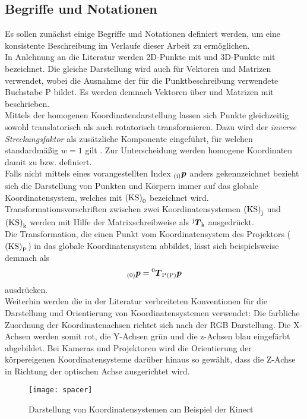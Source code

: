 \subsection{Begriffe und Notationen}
Es sollen zunächst einige Begriffe und Notationen definiert werden, um eine konsistente Beschreibung im Verlaufe dieser Arbeit zu ermöglichen.\\
In Anlehnung an die Literatur \cite{Zhang2000} werden 2D-Punkte mit  und 3D-Punkte mit  bezeichnet. Die gleiche Darstellung wird auch für Vektoren und Matrizen verwendet, wobei die Ausnahme der für die Punktbeschreibung verwendete Buchstabe P bildet. Es werden demnach Vektoren über  und Matrizen mit  beschrieben.\\
Mittels der homogenen Koordinatendarstellung lassen sich Punkte gleichzeitig sowohl translatorisch als auch rotatorisch transformieren. Dazu wird der \textit{inverse Streckungsfaktor} als zusätzliche Komponente eingeführt, für welchen standardmäßig $w=1$ gilt \cite{Nischwitz20111}. Zur Unterscheidung werden homogene Koordinaten damit zu  bzw.  definiert.\\
Falls nicht mittels eines vorangestellten Index ${_{{\mathrm{(i)}}}}\mbox{\boldmath{$p$}}$ anders gekennzeichnet bezieht sich die Darstellung von Punkten und Körpern immer auf das globale Koordinatensystem, welches mit ${\mathrm{(KS)}}_{\mathrm{0}}$ bezeichnet wird. Transformationsvorschriften zwischen zwei Koordinatensystemen ${\mathrm{(KS)}}_{\mathrm{j}}$ und ${\mathrm{(KS)}}_{\mathrm{k}}$ werden mit Hilfe der Matrixschreibweise als ${^{\mathrm{j}}\mbox{\boldmath{$T$}}_{\mathrm{k}}}$ ausgedrückt.\\
Die Transformation, die einen Punkt vom Koordinatensystem des Projektors (${\mathrm{(KS)}}_{\mathrm{P}}$) in das globale Koordinatensystem abbildet, lässt sich beispielsweise demnach als
\begin{equation}
{_{{\mathrm{(0)}}}}\mbox{\boldmath{$p$}} = {^{\mathrm{0}}\mbox{\boldmath{$T$}}_{\mathrm{P}}}{_{{\mathrm{(P)}}}}\mbox{\boldmath{$p$}}
\end{equation}
ausdrücken.\\
Weiterhin werden die in der Literatur verbreiteten Konventionen für die Darstellung und Orientierung von Koordinatensystemen verwendet: Die farbliche Zuordnung der Koordinatenachsen richtet sich nach der RGB Darstellung. Die X-Achsen werden somit rot, die Y-Achsen grün und die z-Achsen blau eingefärbt abgebildet. Bei Kameras und Projektoren wird die Orientierung der körpereigenen Koordinatensysteme darüber hinaus so gewählt, dass die Z-Achse in Richtung der optischen Achse ausgerichtet wird.\\ 
\begin{figure}[ht]
	\begin{center}
		\texttt{[image: spacer]}
		\caption{Darstellung von Koordinatensystemen am Beispiel der Kinect}
		\label{fig.coords}
	\end{center}
\end{figure}

